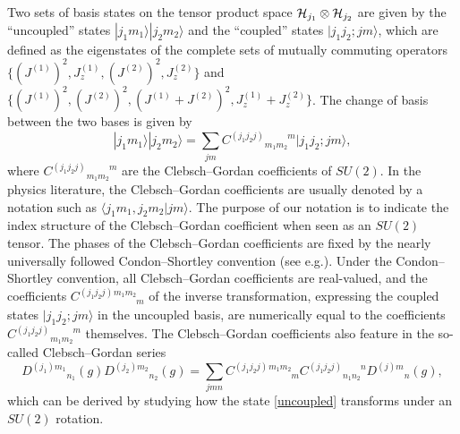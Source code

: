\documentclass[graybox, secnum]{svmult}
\makeatletter
\newcommand{\ket}[1]{|#1\rangle}
\newcommand{\braket}[2]{\langle #1 | #2 \rangle}
\newcommand{\eg}{e.g.\@\xspace}
\newcommand{\updown}[2]{^{#1}_{\phantom{#1}#2}}
\newcommand{\downup}[2]{_{#1}^{\phantom{#1}#2}}
\newcommand{\idx}[1]{#1}
\newcommand{\DD}[4]{{D^{(#1)#2}}_{#3}(#4)}
\newcommand{\CG}[4]{C^{(#1#2)}{}\downup{#3}{#4}}
\newcommand{\CGi}[4]{C^{(#1#2)}{}\updown{#3}{#4}}
\makeatother
\begin{document}
Two sets of basis states on the tensor product space ${\cal H}_{j_1}\otimes {\cal H}_{j_2}$ are given by the ``uncoupled'' states $\ket{j_1m_1}\ket{j_2m_2}$ and the ``coupled'' states $\ket{j_1j_2;jm}$, which are defined as the eigenstates of the complete sets of mutually commuting operators $\bigl\{(J^{(1)})^2, J^{(1)}_z, (J^{(2)})^2, J^{(2)}_z\bigr\}$ and $\bigl\{(J^{(1)})^2, (J^{(2)})^2, (J^{(1)} + J^{(2)})^2, J^{(1)}_z + J^{(2)}_z\bigr\}$. The change of basis between the two bases is given by
\begin{equation}
	\ket{j_1m_1}\ket{j_2m_2} = \sum_{jm} \CG{j_1j_2}{j}{m_1m_2}{m}\ket{j_1j_2;jm},
	\label{uncoupled}
\end{equation}
where $\CG{j_1j_2}{j}{m_1m_2}{m}$ are the \idx{Clebsch--Gordan coefficients} of $SU(2)$. In the physics literature, the Clebsch--Gordan coefficients are usually denoted by a notation such as $\braket{j_1m_1,j_2m_2}{jm}$. The purpose of our notation is to indicate the index structure of the Clebsch--Gordan coefficient when seen as an $SU(2)$ tensor. The phases of the Clebsch--Gordan coefficients are fixed by the nearly universally followed Condon--Shortley convention (see \eg \cite{brink1968angular, Edmonds, Varshalovich:1988ye}). Under the Condon--Shortley convention, all Clebsch--Gordan coefficients are real-valued, and the coefficients $\CGi{j_1j_2}{j}{m_1m_2}{m}$ of the inverse transformation, expressing the coupled states $\ket{j_1j_2;jm}$ in the uncoupled basis, are numerically equal to the coefficients $\CG{j_1j_2}{j}{m_1m_2}{m}$ themselves. The Clebsch--Gordan coefficients also feature in the so-called Clebsch--Gordan series
\begin{equation}
	\DD{j_1}{m_1}{n_1}{g}\DD{j_2}{m_2}{n_2}{g} = \sum_{jmn} \CGi{j_1j_2}{j}{m_1m_2}{m}\CG{j_1j_2}{j}{n_1n_2}{n}\DD{j}{m}{n}{g},
	\label{DD}
\end{equation}
which can be derived by studying how the state \eqref{uncoupled} transforms under an $SU(2)$ rotation.
\end{document}
